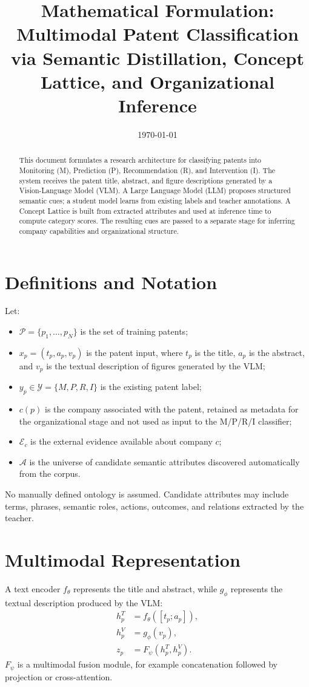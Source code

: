 \documentclass[11pt,a4paper]{article}
\title{Mathematical Formulation: Multimodal Patent Classification via Semantic Distillation, Concept Lattice, and Organizational Inference}
\author{}
\date{\today}
\begin{document}
\maketitle

\begin{abstract}
This document formulates a research architecture for classifying patents into Monitoring (M), Prediction (P), Recommendation (R), and Intervention (I). The system receives the patent title, abstract, and figure descriptions generated by a Vision-Language Model (VLM). A Large Language Model (LLM) proposes structured semantic cues; a student model learns from existing labels and teacher annotations. A Concept Lattice is built from extracted attributes and used at inference time to compute category scores. The resulting cues are passed to a separate stage for inferring company capabilities and organizational structure.
\end{abstract}

\section{Definitions and Notation}
Let:
\begin{itemize}
\item $\mathcal{P}=\{p_1,\ldots,p_N\}$ is the set of training patents;
\item $x_p=(t_p,a_p,v_p)$ is the patent input, where $t_p$ is the title, $a_p$ is the abstract, and $v_p$ is the textual description of figures generated by the VLM;
\item $y_p\in\mathcal{Y}=\{M,P,R,I\}$ is the existing patent label;
\item $c(p)$ is the company associated with the patent, retained as metadata for the organizational stage and not used as input to the M/P/R/I classifier;
\item $\mathcal{E}_{c}$ is the external evidence available about company $c$;
\item $\mathcal{A}$ is the universe of candidate semantic attributes discovered automatically from the corpus.
\end{itemize}
No manually defined ontology is assumed. Candidate attributes may include terms, phrases, semantic roles, actions, outcomes, and relations extracted by the teacher.

\section{Multimodal Representation}
A text encoder $f_{\theta}$ represents the title and abstract, while $g_{\phi}$ represents the textual description produced by the VLM:
\begin{align}
h_p^T &= f_{\theta}([t_p;a_p]),\\
h_p^V &= g_{\phi}(v_p),\\
z_p &= F_{\psi}(h_p^T,h_p^V).
\end{align}
$F_{\psi}$ is a multimodal fusion module, for example concatenation followed by projection or cross-attention.
\end{document}

